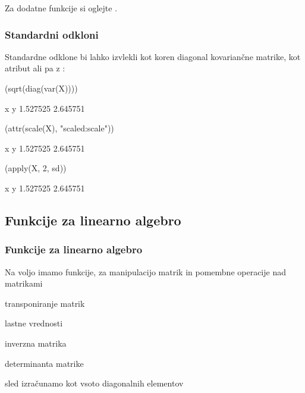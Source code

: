 Za dodatne funkcije si oglejte .

\begin{frame}[fragile]
\frametitle{Standardni odkloni}
Standardne odklone bi lahko izvlekli kot koren diagonal
kovariančne matrike, kot atribut  ali pa z :

\begin{Schunk}
\begin{Sinput}
 (sqrt(diag(var(X))))
\end{Sinput}
\begin{Soutput}
       x        y 
1.527525 2.645751 
\end{Soutput}
\begin{Sinput}
 (attr(scale(X), "scaled:scale"))
\end{Sinput}
\begin{Soutput}
       x        y 
1.527525 2.645751 
\end{Soutput}
\begin{Sinput}
 (apply(X, 2, sd))
\end{Sinput}
\begin{Soutput}
       x        y 
1.527525 2.645751 
\end{Soutput}
\end{Schunk}
\end{frame}


\subsection{Funkcije za linearno algebro}

\begin{frame}[fragile]
\frametitle{Funkcije za linearno algebro}
Na voljo imamo funkcije, za manipulacijo matrik in pomembne operacije nad matrikami
\begin{itemize*}
  \item {} transponiranje matrik
  \item {} lastne vrednosti
  \item {} inverzna matrika
  \item {} determinanta matrike
  \item sled izračunamo kot vsoto diagonalnih elementov
\end{itemize*}
\end{frame}


